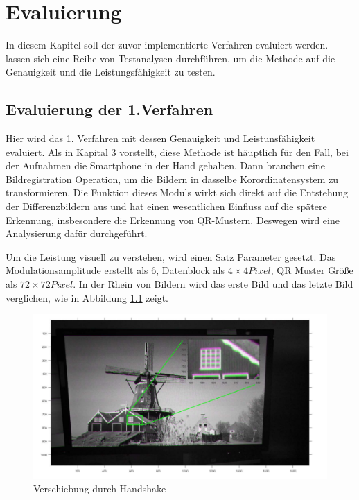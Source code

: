 \chapter{Evaluierung} \label{cha:Evaluierung}

In diesem Kapitel soll der zuvor implementierte Verfahren evaluiert werden.  lassen sich eine Reihe von Testanalysen durchführen, um die Methode auf die Genauigkeit und die Leistungsfähigkeit zu testen.


\section{Evaluierung der 1.Verfahren}

Hier wird das 1. Verfahren mit dessen Genauigkeit und Leistunsfähigkeit evaluiert. Als in Kapital 3 vorstellt, diese Methode ist häuptlich für den Fall, bei der Aufnahmen die Smartphone in der Hand gehalten. Dann brauchen eine Bildregistration Operation, um die Bildern in dasselbe Korordinatensystem zu transformieren. Die Funktion dieses Moduls wirkt sich direkt auf die Entstehung der Differenzbildern aus und hat einen wesentlichen Einfluss auf die spätere Erkennung, insbesondere die Erkennung von QR-Mustern. Deswegen wird eine Analysierung dafür durchgeführt.

Um die Leistung visuell zu verstehen, wird einen Satz Parameter gesetzt. Das Modulationsamplitude erstellt als 6, Datenblock als $ 4 \times 4 Pixel$, QR Muster Größe als $ 72 \times 72 Pixel $.  In der Rhein von Bildern wird das erste Bild und das letzte Bild verglichen, wie in Abbildung \ref{fig:vorregistration} zeigt. 



\begin{figure}[H]
 \centering 
  \includegraphics[keepaspectratio,width=1.0\textwidth]{images/5_Implementirung/vorregistration.pdf}
 \caption{Verschiebung durch Handshake}
 \label{fig:vorregistration}
\end{figure}

